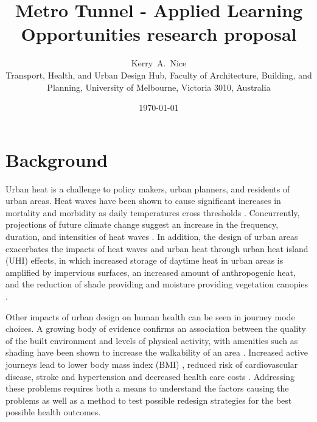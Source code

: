 \documentclass[final,3p,times,authoryear]{elsarticle}
\begin{document}
     
 \title{Metro Tunnel - Applied Learning Opportunities research proposal}
 \author{Kerry~A.~Nice
 \\Transport, Health, and Urban Design Hub, Faculty of Architecture, Building, and Planning, University of Melbourne, Victoria 3010, Australia}
 \date{\today}
 \maketitle

\section{Background}\label{sec:introduction}
Urban heat is a challenge to policy makers, urban planners, and residents of urban areas. Heat waves have been shown to cause significant increases in mortality and morbidity as daily temperatures cross thresholds \citep{Nicholls2008}. Concurrently, projections of future climate change suggest an increase in the frequency, duration, and intensities of heat waves \citep{Alexander2009}. In addition, the design of urban areas exacerbates the impacts of heat waves and urban heat through urban heat island (UHI) effects, in which increased storage of daytime heat in urban areas is amplified by impervious surfaces, an increased amount of anthropogenic heat, and the reduction of shade providing and moisture providing vegetation canopies \citep{Coutts2012}.

Other impacts of urban design on human health can be seen in journey mode choices. A growing body of evidence confirms an association between the quality of the built environment and levels of physical activity, with amenities such as shading have been shown to increase the walkability of an area \citep{Millington2009,Gallin2001,LSA2003}. Increased active journeys lead to lower body mass index (BMI) \citep{Davison2008,Lee2008b}, reduced risk of cardiovascular disease, stroke and hypertension \citep{WHO2010,Warburton2006} and decreased health care costs \citep{Stephenson2000}. Addressing these problems requires both a means to understand the factors causing the problems as well as a method to test possible redesign strategies for the best possible health outcomes.
\end{document}
